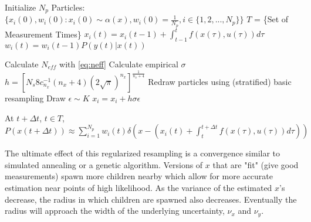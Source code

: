  \begin{algorithmic}
\STATE Initialize $N_p$ Particles: 
        $\{x_i(0),w_i(0) : x_i(0) \sim \alpha(x), w_i(0) = \frac{1}{N_p}, i \in \{1, 2, ... , N_p\} \}$
\STATE $T$ = \{Set of Measurement Times\}
        \STATE $x_i(t) = x_i(t-1) + \int_{t-1}^t f(x(\tau), u(\tau)) d\tau $
        \STATE $w_i(t) = w_i(t-1)P(y(t) | x(t))$
    \ENDFOR

    \STATE Calculate $N_{eff}$ with \autoref{eq:neff}
        \STATE Calculate empirical $\sigma$ 
        \STATE $h = [N_s8c^{-1}_{n_x}(n_x + 4)(2\sqrt{\pi})^{n_x}]^{\frac{1}{n_x +4}}$
        \STATE Redraw particles using (stratified) basic resampling
            \STATE Draw $\epsilon \sim K$
            \STATE $x_i = x_i + h \sigma \epsilon$
        \ENDFOR
    \ENDIF
\ENDFOR

\STATE At $t + \Delta t$, $t \in T$, $P(x(t+\Delta t)) \approx 
\sum_{i=1}^{N_p} w_i(t)\delta\left(x - (x_i(t) + \int_t^{t+\Delta t} f(x(\tau), u(\tau)) d\tau) \right)$

 \end{algorithmic}

The ultimate effect of this regularized resampling is a convergence similar to simulated annealing
or a genetic algorithm. Versions of $x$ that are "fit" (give good measurements) spawn more children 
nearby which allow for more accurate estimation near points of high likelihood. 
As the variance of the estimated
$x$'s decrease, the radius in which children are spawned also decreases. Eventually the radius
will approach the width of the underlying uncertainty, $\nu_x$ and $\nu_y$.

